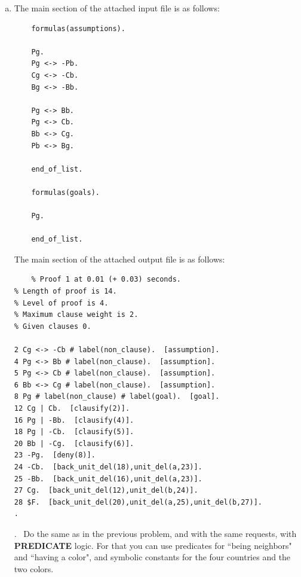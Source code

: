 \documentclass[fullpage]{article}
\begin{document}
\begin{enumerate}[(a)]
\item

The main section of the attached input file is as follows:

{\small
\begin{verbatim}
	formulas(assumptions).
	
	Pg.
	Pg <-> -Pb.
	Cg <-> -Cb.
	Bg <-> -Bb.

	Pg <-> Bb.
	Pg <-> Cb.
	Bb <-> Cg.
	Pb <-> Bg.

	end_of_list.

	formulas(goals).
	
	Pg.
	
	end_of_list.

 \end{verbatim}
}
 The main section of the attached output file is as follows:

 {\footnotesize \begin{verbatim}
	% Proof 1 at 0.01 (+ 0.03) seconds.
% Length of proof is 14.
% Level of proof is 4.
% Maximum clause weight is 2.
% Given clauses 0.

2 Cg <-> -Cb # label(non_clause).  [assumption].
4 Pg <-> Bb # label(non_clause).  [assumption].
5 Pg <-> Cb # label(non_clause).  [assumption].
6 Bb <-> Cg # label(non_clause).  [assumption].
8 Pg # label(non_clause) # label(goal).  [goal].
12 Cg | Cb.  [clausify(2)].
16 Pg | -Bb.  [clausify(4)].
18 Pg | -Cb.  [clausify(5)].
20 Bb | -Cg.  [clausify(6)].
23 -Pg.  [deny(8)].
24 -Cb.  [back_unit_del(18),unit_del(a,23)].
25 -Bb.  [back_unit_del(16),unit_del(a,23)].
27 Cg.  [back_unit_del(12),unit_del(b,24)].
28 $F.  [back_unit_del(20),unit_del(a,25),unit_del(b,27)].
.
\end{verbatim} }
. \ Do the same as in the previous problem, and with the same requests, with {\bf PREDICATE} logic. For that you can use predicates for ``being neighbors" and ``having a color", 
and symbolic constants for the four countries and the two colors.\\


\end{enumerate}
\end{document}

